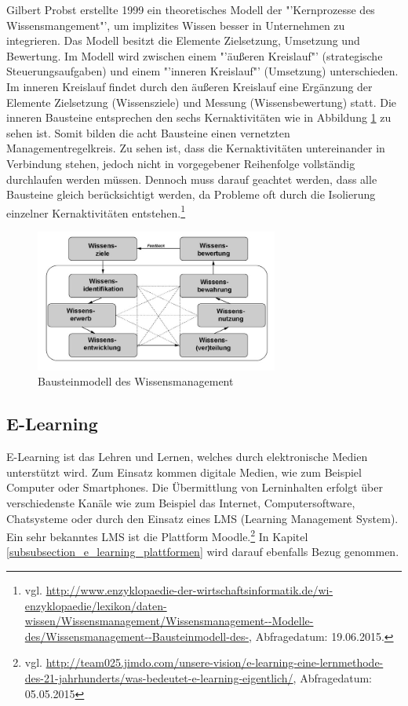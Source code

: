 Gilbert Probst erstellte 1999 ein theoretisches Modell der "'Kernprozesse des Wissensmangement"', um implizites Wissen besser in Unternehmen zu integrieren. Das Modell besitzt die Elemente Zielsetzung, Umsetzung und Bewertung. Im Modell wird zwischen einem "'äußeren Kreislauf"' (strategische Steuerungsaufgaben) und einem "'inneren Kreislauf"' (Umsetzung) unterschieden. Im inneren Kreislauf findet durch den äußeren Kreislauf eine Ergänzung der Elemente Zielsetzung (Wissensziele) und Messung (Wissensbewertung) statt. Die inneren Bausteine entsprechen den sechs Kernaktivitäten wie in Abbildung \ref{fig_wissensmanagament_probst} zu sehen ist. Somit bilden die acht Bausteine einen vernetzten Managementregelkreis. Zu sehen ist, dass die Kernaktivitäten untereinander in Verbindung stehen, jedoch nicht in vorgegebener Reihenfolge vollständig durchlaufen werden müssen. Dennoch muss darauf geachtet werden, dass alle Bausteine gleich berücksichtigt werden, da Probleme oft durch die Isolierung einzelner Kernaktivitäten entstehen.\footnote{vgl. \url{http://www.enzyklopaedie-der-wirtschaftsinformatik.de/wi-enzyklopaedie/lexikon/daten-wissen/Wissensmanagement/Wissensmanagement--Modelle-des/Wissensmanagement--Bausteinmodell-des-}, Abfragedatum: 19.06.2015.} 

\begin{figure}[h!]
	\centering
	\includegraphics[width=8cm]{kapitel/gruppe2/bilder/wissensmanagament_probst}
	\caption{ Bausteinmodell des Wissensmanagement \protect\footnotemark}
	\label{fig_wissensmanagament_probst}
\end{figure}

\subsection{E-Learning}
E-Learning ist das Lehren und Lernen, welches durch elektronische Medien unterstützt wird. Zum Einsatz kommen digitale Medien, wie zum Beispiel Computer oder Smartphones. Die Übermittlung von Lerninhalten erfolgt über verschiedenste Kanäle wie zum Beispiel das Internet, Computersoftware, Chatsysteme oder durch den Einsatz eines LMS (Learning Management System). Ein sehr bekanntes LMS ist die Plattform Moodle.\footnote{vgl. \url{http://team025.jimdo.com/unsere-vision/e-learning-eine-lernmethode-des-21-jahrhunderts/was-bedeutet-e-learning-eigentlich/}, Abfragedatum: 05.05.2015} In Kapitel \ref{subsubsection_e_learning_plattformen} wird darauf ebenfalls Bezug genommen.

